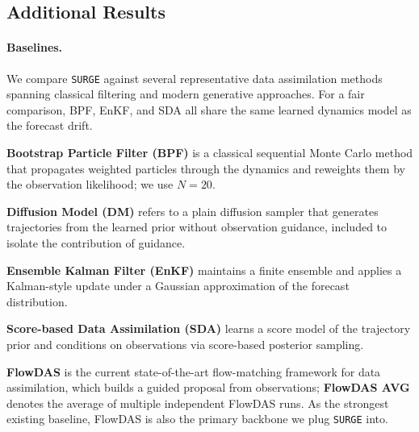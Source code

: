 \documentclass{article}
\theoremstyle{plain}
\theoremstyle{definition}
\theoremstyle{remark}
\begin{document}
\subsection{Additional Results}

\paragraph{Baselines.}
We compare \texttt{SURGE} against several representative data assimilation methods spanning classical filtering and modern generative approaches. For a fair comparison, BPF, EnKF, and SDA all share the same learned dynamics model as the forecast drift.


\textbf{Bootstrap Particle Filter (BPF)} is a classical sequential Monte Carlo method that propagates weighted particles through the dynamics and reweights them by the observation likelihood\cite{gordon1993novel}; we use $N=20$.

\textbf{Diffusion Model (DM)} refers to a plain diffusion sampler that generates trajectories from the learned prior without observation guidance, included to isolate the contribution of guidance.

\textbf{Ensemble Kalman Filter (EnKF)} maintains a finite ensemble and applies a Kalman-style update under a Gaussian approximation of the forecast distribution\cite{evensen2003ensemble}.

\textbf{Score-based Data Assimilation (SDA)} learns a score model of the trajectory prior and conditions on observations via score-based posterior sampling\cite{rozet2023score}.

\textbf{FlowDAS} is the current state-of-the-art flow-matching framework for data assimilation, which builds a guided proposal from observations\cite{chen2025flowdas}; \textbf{FlowDAS AVG} denotes the average of multiple independent FlowDAS runs. As the strongest existing baseline, FlowDAS is also the primary backbone we plug \texttt{SURGE} into.
\end{document}
